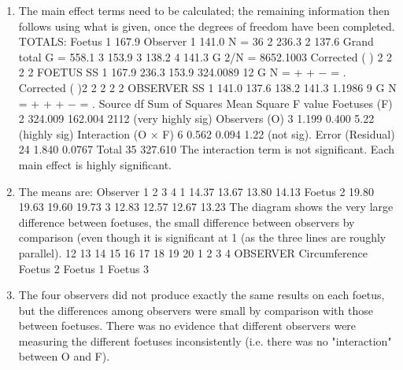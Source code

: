 \documentclass[a4paper,12pt]{article}
\begin{document}
\begin{enumerate} 
\item  The main effect terms need to be calculated; the remaining information then follows
using what is given, once the degrees of freedom have been completed.
TOTALS: Foetus 1 167.9 Observer 1 141.0 N = 36
2 236.3 2 137.6 Grand total G = 558.1
3 153.9 3 138.2
4 141.3 G 2/N = 8652.1003
Corrected ( ) 2
2 2 2
FOETUS
SS 1 167.9 236.3 153.9 324.0089
12
G
N
= + + − = .
Corrected ( )2
2 2 2 2
OBSERVER
SS 1 141.0 137.6 138.2 141.3 1.1986
9
G
N
= + + + − = .
Source df Sum of Squares Mean Square F value
Foetuses (F) 2 324.009 162.004 2112 (very highly sig)
Observers (O) 3 1.199 0.400 5.22 (highly sig)
Interaction (O × F) 6 0.562 0.094 1.22 (not sig).
Error (Residual) 24 1.840 0.0767
Total 35 327.610
The interaction term is not significant. Each main effect is highly significant.
\item  The means are:
Observer
1 2 3 4
1 14.37 13.67 13.80 14.13
Foetus 2 19.80 19.63 19.60 19.73
3 12.83 12.57 12.67 13.23
The diagram shows the very large difference between foetuses, the small difference between
observers by comparison (even though it is significant at 1%
(as the three lines are roughly parallel).
12
13
14
15
16
17
18
19
20
1 2 3 4
OBSERVER
Circumference
Foetus 2
Foetus 1
Foetus 3
\item  The four observers did not produce exactly the same results on each foetus, but the
differences among observers were small by comparison with those between foetuses. There
was no evidence that different observers were measuring the different foetuses inconsistently
(i.e. there was no "interaction" between O and F).

\end{enumerate}
\end{document}

